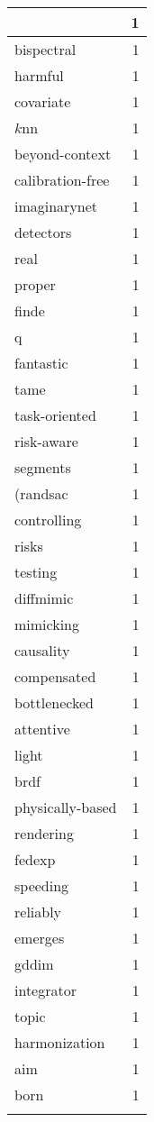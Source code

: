\begin{table}[h]
\begin{tabular}{|l|r|}
{\hline
split & 1 \\
\hline
bispectral & 1 \\
\hline
harmful & 1 \\
\hline
covariate & 1 \\
\hline
$k$nn & 1 \\
\hline
beyond-context & 1 \\
\hline
calibration-free & 1 \\
\hline
imaginarynet & 1 \\
\hline
detectors & 1 \\
\hline
real & 1 \\
\hline
proper & 1 \\
\hline
finde & 1 \\
\hline
q & 1 \\
\hline
fantastic & 1 \\
\hline
tame & 1 \\
\hline
task-oriented & 1 \\
\hline
risk-aware & 1 \\
\hline
segments & 1 \\
\hline
(randsac & 1 \\
\hline
controlling & 1 \\
\hline
risks & 1 \\
\hline
testing & 1 \\
\hline
diffmimic & 1 \\
\hline
mimicking & 1 \\
\hline
causality & 1 \\
\hline
compensated & 1 \\
\hline
bottlenecked & 1 \\
\hline
attentive & 1 \\
\hline
light & 1 \\
\hline
brdf & 1 \\
\hline
physically-based & 1 \\
\hline
rendering & 1 \\
\hline
fedexp & 1 \\
\hline
speeding & 1 \\
\hline
reliably & 1 \\
\hline
emerges & 1 \\
\hline
gddim & 1 \\
\hline
integrator & 1 \\
\hline
topic & 1 \\
\hline
harmonization & 1 \\
\hline
aim & 1 \\
\hline
born & 1 \\
}
\end{tabular}
\end{table}
